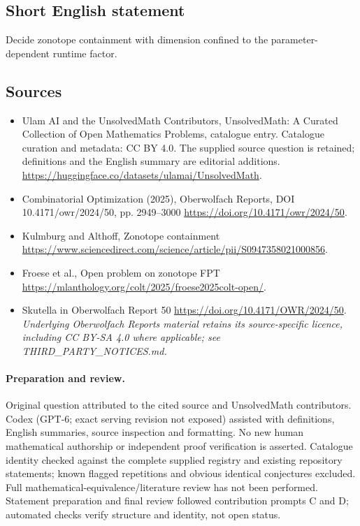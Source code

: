\documentclass[11pt]{article}
\begin{document}
\subsection{Short English statement}
Decide zonotope containment with dimension confined to the parameter-dependent runtime factor.
\subsection{Sources}
\begin{itemize}
\item[\hypertarget{source:statement:1}{S1}] Ulam AI and the UnsolvedMath Contributors, UnsolvedMath: A Curated Collection of Open Mathematics Problems, catalogue entry. Catalogue curation and metadata: CC BY 4.0. The supplied source question is retained; definitions and the English summary are editorial additions.
\url{https://huggingface.co/datasets/ulamai/UnsolvedMath}.
\item[\hypertarget{source:statement:2}{S2}] Combinatorial Optimization (2025), Oberwolfach Reports, DOI 10.4171/owr/2024/50, pp. 2949--3000
\url{https://doi.org/10.4171/owr/2024/50}.
\item[\hypertarget{source:statement:3}{S3}] Kulmburg and Althoff, Zonotope containment
\url{https://www.sciencedirect.com/science/article/pii/S0947358021000856}.
\item[\hypertarget{source:statement:4}{S4}] Froese et al., Open problem on zonotope FPT
\url{https://mlanthology.org/colt/2025/froese2025colt-open/}.
\item[\hypertarget{source:statement:5}{S5}] Skutella in Oberwolfach Report 50
\url{https://doi.org/10.4171/OWR/2024/50}.
\textit{Underlying Oberwolfach Reports material retains its source-specific licence, including CC BY-SA 4.0 where applicable; see THIRD\_PARTY\_NOTICES.md.}
\end{itemize}
\paragraph{Preparation and review.}
Original question attributed to the cited source and UnsolvedMath contributors. Codex (GPT-6; exact serving revision not exposed) assisted with definitions, English summaries, source inspection and formatting. No new human mathematical authorship or independent proof verification is asserted. Catalogue identity checked against the complete supplied registry and existing repository statements; known flagged repetitions and obvious identical conjectures excluded. Full mathematical-equivalence/literature review has not been performed. Statement preparation and final review followed contribution prompts C and D; automated checks verify structure and identity, not open status.
\label{end:statement}
\end{document}
